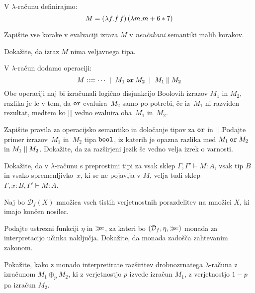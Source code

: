 \documentclass[arhiv]{../izpit}
\begin{document}

\naloga[\tocke{15}]

V $\lambda$-računu definirajmo:
\[
  M = (\lambda f. f \, f) \, (\lambda m. m + 6 * 7)
\]

\podnaloga
Zapišite vse korake v evalvaciji izraza $M$ v \emph{neučakani} semantiki malih korakov.

\podnaloga
Dokažite, da izraz $M$ nima veljavnega tipa.

\nadaljevanje


\naloga[\tocke{25}]
V $\lambda$-račun dodamo operaciji:
\[
  M \mathrel{{:}{:}{=}} \cdots \;\mid\;
  M_1 \mathbin{\mathtt{or}} M_2 \;\mid\;
  M_1 \mathbin{\mathtt{||}} M_2
\]
Obe operaciji naj bi izračunali logično disjunkcijo Boolovih izrazov $M_1$ in $M_2$, razlika je le v tem, da $\mathbin{\mathtt{or}}$ evaluira~$M_2$ samo po potrebi, če iz~$M_1$ ni razviden rezultat, medtem ko $\mathbin{\mathtt{||}}$ vedno evaluira oba~$M_1$ in~$M_2$.

\podnaloga Zapišite pravila za operacijsko semantiko in določanje tipov za $\mathbin{\mathtt{or}}$ in $\mathbin{\mathtt{||}}$.\prostor[2]
\podnaloga Podajte primer izrazov~$M_1$ in~$M_2$ tipa $\mathtt{bool}$,
  iz katerih je opazna razlika med $M_1 \mathbin{\mathtt{or}} M_2$ in $M_1 \mathbin{\mathtt{||}} M_2$.\prostor
\podnaloga Dokažite, da za razširjeni jezik še vedno velja izrek o varnosti.\prostor[2]

\nadaljevanje


\naloga[\tocke{20}]

Dokažite, da v $\lambda$-računu s preprostimi tipi za vsak sklep $\Gamma, \Gamma' \vdash M : A$, vsak tip $B$ in vsako spremenljivko~$x$, ki se ne pojavlja v $M$, velja tudi sklep $\Gamma, x : B, \Gamma' \vdash M : A$.

\nadaljevanje


\naloga[\tocke{20}]

Naj bo $\mathcal{D}_f(X)$ množica vseh tistih verjetnostnih porazdelitev na množici $X$, ki imajo končen nosilec.

\podnaloga Podajte ustrezni funkciji $\eta$ in $\mathop{>\!\!\!>\!\!\!=}$, za kateri bo $(\mathcal{D}_f, \eta, \mathop{>\!\!\!>\!\!\!=})$ monada za interpretacijo učinka naključja. Dokažite, da monada zadošča zahtevanim zakonom.

\podnaloga Pokažite, kako z monado interpretirate razširitev drobnozrnatega $\lambda$-računa z izračunom $M_1 \oplus_p M_2$, ki z verjetnostjo $p$ izvede izračun $M_1$, z verjetnostjo $1 - p$ pa izračun $M_2$.



\nadaljevanje
\end{document}
